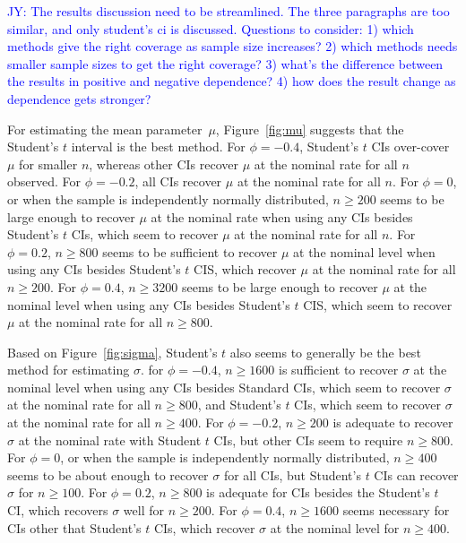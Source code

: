 \documentclass[12pt, letterpaper, titlepage]{article}
\newcommand{\jy}[1]{\textcolor{blue}{JY: #1}}
\begin{document}
\jy{The results discussion need to be streamlined. The three paragraphs are too
  similar, and only student's ci is discussed. Questions to consider:
  1) which methods give the right coverage as sample size increases?
  2) which methods needs smaller sample sizes to get the right coverage?
  3) what's the difference between the results in positive and negative
  dependence?
  4) how does the result change as dependence gets stronger?
  }

For estimating the mean parameter~$\mu$,
Figure~\ref{fig:mu} suggests that the Student's $t$ interval is the best method.
For $\phi = -0.4$, Student's $t$ CIs over-cover 
$\mu$ for smaller $n$, whereas other CIs recover $\mu$ at the
nominal rate for all $n$ observed. For 
$\phi = -0.2$, 
all CIs recover $\mu$ at the nominal rate for all $n$. For $\phi = 0$, or when the 
sample is independently normally distributed, $n \geq 200$ seems to 
be large enough to recover $\mu$ at the nominal rate when using any CIs
 besides Student's $t$ CIs, which seem to recover $\mu$ at the nominal rate for
  all $n$.
For $\phi = 0.2$, $n \geq 800$ seems to be sufficient to recover $\mu$
at the nominal level when using
any CIs besides Student's $t$ CIS, which recover $\mu$ at the nominal
 rate for all $n \geq 200$.
For $\phi = 0.4$, $n \geq 3200$ seems to be large enough to recover $\mu$
at the nominal level when using
any CIs besides Student's $t$ CIS, which seem to recover $\mu$ at the nominal
 rate for all $n \geq 800$.


Based on Figure~\ref{fig:sigma}, Student's $t$ also seems to generally
be the best method for estimating $\sigma$.
for $\phi = -0.4$, $n \geq 1600$ is sufficient to recover $\sigma$
at the nominal level when using
any CIs besides Standard CIs, which seem to recover $\sigma$ at the nominal 
rate for all $n \geq 800$, and Student's $t$ CIs, which seem to recover $\sigma$
at the nominal rate for all $n \geq 400$. For $\phi = -0.2$, $n \geq 200$ is 
adequate to recover $\sigma$ at the nominal rate with Student $t$ CIs, 
but other CIs seem to require $n \geq 800$. For $\phi = 0$, or when the sample
is independently normally distributed, $n \geq 400$ seems to be about enough
to recover $\sigma$ for all CIs, but Student's $t$ CIs can recover $\sigma$ for
$n \geq 100$. For $\phi = 0.2$, $n \geq 800$ is adequate for CIs besides the
Student's $t$ CI, which recovers $\sigma$ well for $n \geq 200$. For 
$\phi  = 0.4$, $n \geq 1600$ seems necessary for CIs other that Student's $t$ 
CIs, which recover $\sigma$ at the nominal level for $n \geq 400$.
\end{document}
